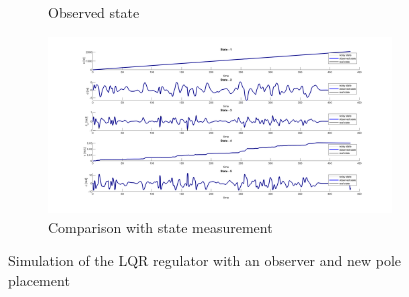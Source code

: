 \begin{figure}[H]
\begin{subfigure}[b]{0.8\textwidth}
         \caption{Observed state}
         \label{fig:NPState}
     \end{subfigure}
     \begin{subfigure}[b]{0.8\textwidth}
         \centering
         \includegraphics[width=\textwidth]{Latex report/image/ex2/obsNewpole.png}
         \caption{Comparison with state measurement}
         \label{fig:NPObs}
     \end{subfigure}
    \caption{Simulation of the LQR regulator with an observer and new pole placement}
    \label{fig:NP}
\end{figure}

